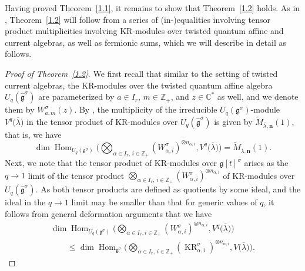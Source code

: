 \documentclass[10pt,a4paper]{amsart}
\numberwithin{equation}{section}
\DeclareMathOperator{\KR}{KR}
\DeclareMathOperator{\Hom}{Hom}
\begin{document}
Having proved Theorem~\ref{1.1}, it remains to show that Theorem~\ref{1.2} holds. As in \cite[Section~1]{Kedem11}, Theorem~\ref{1.2} will follow from a series of (in-)equalities involving tensor product multiplicities involving KR-modules over twisted quantum affine and current algebras, as well as fermionic sums, which we will describe in detail as follows.

\begin{proof}[Proof of Theorem~\ref{1.2}]
We first recall that similar to the setting of twisted current algebras, the KR-modules over the twisted quantum affine algebra $U_q(\widehat{\mathfrak{g}}^{\sigma})$ are parameterized by $a\in I_r$, $m\in\mathbb{Z}_+$, and $z\in\mathbb{C}^*$ as well, and we denote them by $W_{a,m}^{\sigma}(z)$. By \cite[Theorem 8.5]{Hernandez10}, the multiplicity of the irreducible $U_q(\mathfrak{g}^{ \sigma})$-module $V^q\bigl(\overline{\lambda}\bigr)$ in the tensor product  of KR-modules over $U_q(\widehat{\mathfrak{g}}^{\sigma})$ is given by $\tilde{M}_{\overline{\lambda},\mathbf{n}}(1)$, that is, we have
\begin{equation}
\dim\Hom_{U_q(\mathfrak{g}^{\sigma})}\biggl(\bigotimes_{ \alpha\in I_r,\,i\in\mathbb{Z}_+}(W_{\alpha,i}^{\sigma})^{ \otimes n_{\alpha,i}} ,V^q\bigl(\overline{\lambda}\bigr)\biggr)
=\tilde{M}_{\overline{\lambda},\mathbf{n}}(1).\label{eq:4.26}
\end{equation}
Next, we note that the tensor product \smash{$\bigotimes_{\alpha\in I_r,\,i\in\mathbb{Z}_+} (\KR_{\alpha,i}^{\sigma})^{\otimes n_{\alpha,i}}$} of KR-modules over $\mathfrak{g}[t]^{\sigma}$ arises as the $q\to 1$ limit of the tensor product $\bigotimes_{\alpha\in I_r,\, i\in\mathbb{Z}_+} (W_{\alpha,i}^{\sigma})^{\otimes n_{\alpha,i}}$ of KR-modules over $U_q(\widehat{\mathfrak{g}}^{\sigma})$. As both tensor products are defined as quotients by some ideal, and the ideal in the $q\to 1$ limit may be smaller than that for generic values of $q$, it follows from general deformation arguments that we have
\begin{gather}
\dim\Hom_{U_q(\mathfrak{g}^{\sigma})}\biggl(\bigotimes_{ \alpha\in I_r,i\in\mathbb{Z}_+}(W_{\alpha,i}^{\sigma})^{ \otimes n_{\alpha,i}} ,V^q\bigl(\overline{\lambda}\bigr)\biggr)\nonumber\\
\qquad
\leq\dim\Hom_{\mathfrak{g}^{\sigma}}\biggl(\bigotimes_{ \alpha\in I_r,
\, i\in\mathbb{Z}_+}(\KR_{\alpha,i}^{\sigma})^{ \otimes n_{\alpha,i}},V\bigl(\overline{\lambda}\bigr)\biggr).\label{eq:4.27}

\end{gather}
\end{proof}
\end{document}
